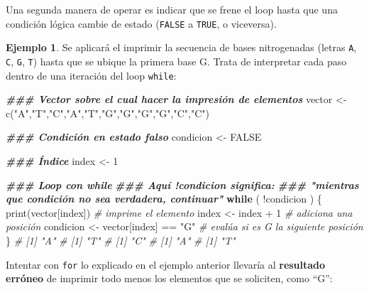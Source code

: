 \documentclass[
]{article}
\newenvironment{Shaded}{\begin{snugshade}}{\end{snugshade}}
\newcommand{\CommentTok}[1]{\textcolor[rgb]{0.56,0.35,0.01}{\textit{#1}}}
\newcommand{\ConstantTok}[1]{\textcolor[rgb]{0.00,0.00,0.00}{#1}}
\newcommand{\ControlFlowTok}[1]{\textcolor[rgb]{0.13,0.29,0.53}{\textbf{#1}}}
\newcommand{\DecValTok}[1]{\textcolor[rgb]{0.00,0.00,0.81}{#1}}
\newcommand{\DocumentationTok}[1]{\textcolor[rgb]{0.56,0.35,0.01}{\textbf{\textit{#1}}}}
\newcommand{\FunctionTok}[1]{\textcolor[rgb]{0.00,0.00,0.00}{#1}}
\newcommand{\NormalTok}[1]{#1}
\newcommand{\OtherTok}[1]{\textcolor[rgb]{0.56,0.35,0.01}{#1}}
\newcommand{\SpecialCharTok}[1]{\textcolor[rgb]{0.00,0.00,0.00}{#1}}
\newcommand{\StringTok}[1]{\textcolor[rgb]{0.31,0.60,0.02}{#1}}
\theoremstyle{definition}
\theoremstyle{definition}
\newtheorem{example}{Ejemplo}[section]
\theoremstyle{definition}
\theoremstyle{definition}
\theoremstyle{remark}
\begin{document}
Una segunda manera de operar es indicar que se frene el loop hasta que una condición lógica cambie de estado (\texttt{FALSE} a \texttt{TRUE}, o viceversa).

\begin{example}

Se aplicará el imprimir la secuencia de bases nitrogenadas (letras \texttt{A}, \texttt{C}, \texttt{G}, \texttt{T}) hasta que se ubique la primera base G. Trata de interpretar cada paso dentro de una iteración del loop \texttt{while}:

\begin{Shaded}
\begin{Highlighting}[]
\DocumentationTok{\#\#\# Vector sobre el cual hacer la impresión de elementos}
\NormalTok{vector }\OtherTok{\textless{}{-}} \FunctionTok{c}\NormalTok{(}\StringTok{"A"}\NormalTok{,}\StringTok{"T"}\NormalTok{,}\StringTok{"C"}\NormalTok{,}\StringTok{"A"}\NormalTok{,}\StringTok{"T"}\NormalTok{,}\StringTok{"G"}\NormalTok{,}\StringTok{"G"}\NormalTok{,}\StringTok{"G"}\NormalTok{,}\StringTok{"G"}\NormalTok{,}\StringTok{"C"}\NormalTok{,}\StringTok{"C"}\NormalTok{)}

\DocumentationTok{\#\#\# Condición en estado falso}
\NormalTok{condicion }\OtherTok{\textless{}{-}} \ConstantTok{FALSE}

\DocumentationTok{\#\#\# Índice}
\NormalTok{index }\OtherTok{\textless{}{-}} \DecValTok{1}

\DocumentationTok{\#\#\# Loop con while}
\DocumentationTok{\#\#\# Aquí !condicion significa: }
\DocumentationTok{\#\#\# "mientras que condición no sea verdadera, continuar" }
\ControlFlowTok{while}\NormalTok{ ( }\SpecialCharTok{!}\NormalTok{condicion ) \{ }
  \FunctionTok{print}\NormalTok{(vector[index]) }\CommentTok{\# imprime el elemento}
\NormalTok{  index }\OtherTok{\textless{}{-}}\NormalTok{ index }\SpecialCharTok{+} \DecValTok{1}   \CommentTok{\# adiciona una posición}
\NormalTok{  condicion }\OtherTok{\textless{}{-}}\NormalTok{ vector[index] }\SpecialCharTok{==} \StringTok{"G"} \CommentTok{\# evalúa si es G la siguiente posición}
\NormalTok{\}}
\CommentTok{\# [1] "A"}
\CommentTok{\# [1] "T"}
\CommentTok{\# [1] "C"}
\CommentTok{\# [1] "A"}
\CommentTok{\# [1] "T"}
\end{Highlighting}
\end{Shaded}

\end{example}

Intentar con \texttt{for} lo explicado en el ejemplo anterior llevaría al \textbf{resultado erróneo} de imprimir todo menos los elementos que se soliciten, como ``G'':
\end{document}
